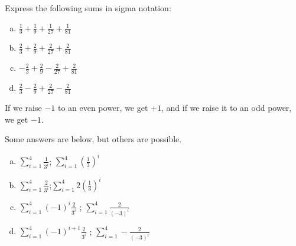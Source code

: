 \begin{Mquestion}\label{1.1powers}
Express the following sums in sigma notation:
\begin{enumerate}[(a)]
\item $\frac{1}{3}+\frac{1}{9}+\frac{1}{27}+\frac{1}{81}$
\item $\frac{2}{3}+\frac{2}{9}+\frac{2}{27}+\frac{2}{81}$
\item $-\frac{2}{3}+\frac{2}{9}-\frac{2}{27}+\frac{2}{81}$
\item $\frac{2}{3}-\frac{2}{9}+\frac{2}{27}-\frac{2}{81}$
\end{enumerate}
\end{Mquestion}
\begin{hint} If we raise $-1$ to an even power, we get $+1$, and if we raise it to an odd power, we get $-1$.
\end{hint}
\begin{answer} Some answers are below, but others are possible.
\begin{enumerate}[(a)]
\item $\displaystyle\sum_{i=1}^4 \frac{1}{3^i}$\quad;\quad
$\displaystyle\sum_{i=1}^4 \left(\frac{1}{3}\right)^i$
\item $\displaystyle\sum_{i=1}^4 \frac{2}{3^i}$\quad;\quad $\displaystyle\sum_{i=1}^4 2\left(\frac{1}{3}\right)^i$
\item $\displaystyle\sum_{i=1}^4(-1)^i \frac{2}{3^i}$
\quad;\quad
$\displaystyle\sum_{i=1}^4  \frac{2}{(-3)^i}$
\item $\displaystyle\sum_{i=1}^4(-1)^{i+1} \frac{2}{3^i}$
\quad;\quad
$\displaystyle\sum_{i=1}^4  -\frac{2}{(-3)^i}$
\end{enumerate}
\end{answer}
